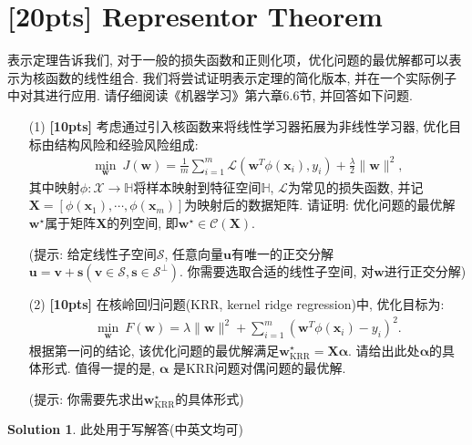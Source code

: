 \documentclass[a4paper,UTF8]{article}
\numberwithin{equation}{section}
\theoremstyle{definition}
\newtheorem*{solution}{Solution}
\def \X {\boldsymbol{X}}
\def \w {\boldsymbol{w}}
\def \u {\boldsymbol{u}}
\def \v {\boldsymbol{v}}
\def \s {\boldsymbol{s}}
\def \x {\boldsymbol{x}}
\def \boldalpha {\boldsymbol{\alpha}}
\begin{document}
\section{[20pts] Representor Theorem}
表示定理告诉我们, 对于一般的损失函数和正则化项，优化问题的最优解都可以表示为核函数的线性组合. 我们将尝试证明表示定理的简化版本, 
并在一个实际例子中对其进行应用. 请仔细阅读《机器学习》第六章6.6节, 并回答如下问题.
\begin{enumerate}
    \item[(1)] \textbf{[10pts]} 考虑通过引入核函数来将线性学习器拓展为非线性学习器, 优化目标由结构风险和经验风险组成:
    \begin{align*}
        \min_{\w} \  J(\w) = \frac{1}{m} \sum_{i=1}^m \mathcal{L}\left(\w^T \phi(\x_i), y_i \right) + \frac{\lambda}{2}\|\w\|^2,
    \end{align*}
    其中映射$\phi: \mathcal{X} \to \mathbb{H}$将样本映射到特征空间$\mathbb{H}$, $\mathcal{L}$为常见的损失函数,
    并记$\X = \left[\phi(\x_1), \cdots, \phi(\x_m)\right]$为映射后的数据矩阵. 请证明: 优化问题的最优解$\w^\star$属于矩阵$\X$的列空间, 即$\w^\star \in \mathcal{C}(\X)$.

    (提示: 给定线性子空间$\mathcal{S}$, 任意向量$\u$有唯一的正交分解$\u = \v + \s(\v \in \mathcal{S}, \s \in \mathcal{S}^{\perp})$. 你需要选取合适的线性子空间, 对$\w$进行正交分解)
    \item[(2)] \textbf{[10pts]} 在核岭回归问题(KRR, kernel ridge regression)中, 优化目标为:
    \begin{align*}
        \min_{\w} \  F(\w) = \lambda\|\w\|^2+\sum_{i=1}^m\left(\w^T\phi(\x_i)-y_i\right)^2.
    \end{align*}
    根据第一问的结论, 该优化问题的最优解满足$\w_{\text{KRR}}^\star = \X \boldalpha$. 请给出此处$\boldalpha$的具体形式. 值得一提的是, $\boldalpha$
    是KRR问题对偶问题的最优解.

    (提示: 你需要先求出$\w_{\text{KRR}}^\star$的具体形式)
\end{enumerate}

\begin{solution}
	此处用于写解答(中英文均可)
	~\\
	~\\
	~\\
\end{solution}

\newpage
\end{document}
